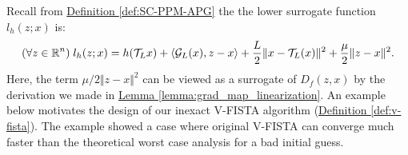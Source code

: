 \documentclass[12pt]{article}
\begin{document}
    \par\noindent
    Recall from 
    \hyperref[def:SC-PPM-APG]{Definition \ref*{def:SC-PPM-APG}}
    the the lower surrogate function $l_h(z; x)$ is: 
    \begin{align*}
        (\forall z \in \mathbb R^n) \; l_h(z; x) = h(\mathcal T_L x) + \langle \mathcal G_L (x), z - x\rangle
        + 
        \frac{L}{2}\Vert x - \mathcal T_L (x)\Vert^2 + \frac{\mu}{2}\Vert z - x\Vert^2. 
    \end{align*}
    Here, the term $\mu/2\Vert z - x\Vert^2$ can be viewed as a surrogate of $D_f(z, x)$ by the derivation we made in
    \hyperref[lemma:grad_map_linearization]{Lemma \ref*{lemma:grad_map_linearization}}. 
    An example below motivates the design of our inexact V-FISTA algorithm (\hyperref[def:v-fista]{Definition \ref*{def:v-fista}}). 
    The example showed a case where original V-FISTA can converge much faster than the theoretical worst case analysis for a bad initial guess. 
\end{document}
